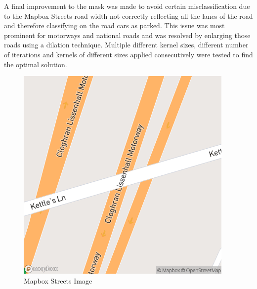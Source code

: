 A final improvement to the mask was made to avoid certain misclassification due to the Mapbox Streets road width not correctly reflecting all the lanes of the road and therefore classifying on the road cars as parked. This issue was most prominent for motorways and national roads and was resolved by enlarging those roads using a dilation technique. Multiple different kernel sizes, different number of iterations and kernels of different sizes applied consecutively were tested to find the optimal solution.

\begin{figure}[htbp]
    \centering
    \begin{minipage}{0.45\textwidth}
        \centering
        \includegraphics[width=\textwidth]{images/streets.png}
        \caption*{Mapbox Streets Image}
    \end{minipage}
    \hfill
    \begin{minipage}{0.45\textwidth}
        \centering

\end{minipage}
\end{figure}
